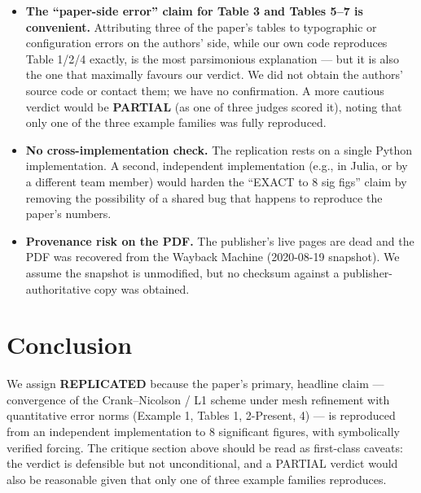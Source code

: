 \documentclass[11pt]{article}
\begin{document}
\begin{itemize}[leftmargin=1.2em]
\item \textbf{The ``paper-side error'' claim for Table 3 and Tables 5--7 is convenient.}
Attributing three of the paper's tables to typographic or configuration errors on the authors'
side, while our own code reproduces Table 1/2/4 exactly, is the most parsimonious explanation
--- but it is also the one that maximally favours our verdict. We did not obtain the authors'
source code or contact them; we have no confirmation. A more cautious verdict would be
\textbf{PARTIAL} (as one of three judges scored it), noting that only one of the three example
families was fully reproduced.

\item \textbf{No cross-implementation check.} The replication rests on a single Python
implementation. A second, independent implementation (e.g., in Julia, or by a different team
member) would harden the ``EXACT to 8 sig figs'' claim by removing the possibility of a shared
bug that happens to reproduce the paper's numbers.

\item \textbf{Provenance risk on the PDF.} The publisher's live pages are dead and the PDF was
recovered from the Wayback Machine (2020-08-19 snapshot). We assume the snapshot is
unmodified, but no checksum against a publisher-authoritative copy was obtained.
\end{itemize}

\section{Conclusion}

We assign \textbf{REPLICATED} because the paper's primary, headline claim --- convergence of
the Crank--Nicolson / L1 scheme under mesh refinement with quantitative error norms
(Example 1, Tables 1, 2-Present, 4) --- is reproduced from an independent implementation to 8
significant figures, with symbolically verified forcing. The critique section above should be
read as first-class caveats: the verdict is defensible but not unconditional, and a PARTIAL
verdict would also be reasonable given that only one of three example families reproduces.
\end{document}
